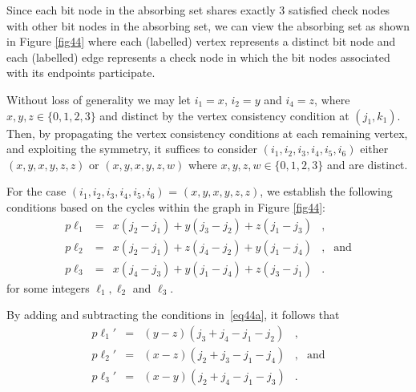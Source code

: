 Since each bit node in the absorbing set shares exactly 3
satisfied check nodes with other bit nodes in the absorbing set,
we can view the absorbing set as shown in Figure \ref{fig44} where
each (labelled) vertex represents a distinct bit node and each
(labelled) edge represents a check node in which the bit nodes
associated with its endpoints participate.


Without loss of generality we may let $i_1=x$, $i_2=y$ and
$i_4=z$, where $x,y,z \in \{0,1,2,3\}$ and distinct by the vertex
consistency condition at $(j_1,k_1)$. Then, by propagating the
vertex consistency conditions at each remaining vertex, and
exploiting the symmetry, it suffices to consider
$(i_1,i_2,i_3,i_4,i_5,i_6)$ either $(x,y,x,y,z,z)$ or
$(x,y,x,y,z,w)$ where $x,y,z,w \in \{0,1,2,3 \}$ and are distinct.

For the case $(i_1,i_2,i_3,i_4,i_5,i_6)$ = $(x,y,x,y,z,z)$, we
establish the following conditions based on the cycles within the
graph in Figure \ref{fig44}:
\begin{equation}\label{eq44a}\begin{array}{ccccc}
p\ell_1&=&x(j_2-j_1)+y(j_3-j_2)+z(j_1-j_3)&,&{} \\
p\ell_2&=&x(j_2-j_1)+z(j_4-j_2)+y(j_1-j_4)&,&\text{and}\\
p\ell_3&=&x(j_4-j_3)+y(j_1-j_4)+z(j_3-j_1)&.&{}
\end{array}\end{equation}
for some integers $\ell_1,\ell_2$ and $\ell_3$.

By adding and subtracting the conditions in~\eqref{eq44a}, it
follows that
\begin{equation}\label{eq44b}\begin{array}{ccccc}
p\ell_1'&=&(y-z)(j_3+j_4-j_1-j_2)&,&{}\\
p\ell_2'&=&(x-z)(j_2+j_3-j_1-j_4)&,&\text{and}\\
p\ell_3'&=&(x-y)(j_2+j_4-j_1-j_3)&.&{}
\end{array}\end{equation}

